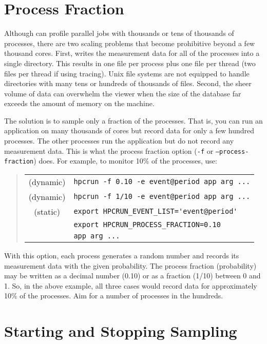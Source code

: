 \section{Process Fraction}

Although \hpcrun{} can profile parallel jobs with thousands or tens of
thousands of processes, there are two scaling problems that become
prohibitive beyond a few thousand cores.  First, \hpcrun{} writes the
measurement data for all of the processes into a single directory.
This results in one file per process plus one file per thread (two
files per thread if using tracing).  Unix file systems are not
equipped to handle directories with many tens or hundreds of thousands
of files.  Second, the sheer volume of data can overwhelm the viewer
when the size of the database far exceeds the amount of memory on the
machine.

The solution is to sample only a fraction of the processes.  That is,
you can run an application on many thousands of cores but record data
for only a few hundred processes.  The other processes run the
application but do not record any measurement data.  This is what the
process fraction option ({\tt -f} or {\tt --process-fraction}) does.
For example, to monitor 10\% of the processes, use:

\begin{quote}
\begin{tabular}{@{}cl}
(dynamic) & \verb|hpcrun -f 0.10 -e event@period app arg ...| \\
(dynamic) & \verb|hpcrun -f 1/10 -e event@period app arg ...| \\
(static)  & \verb|export HPCRUN_EVENT_LIST='event@period'| \\
& \verb|export HPCRUN_PROCESS_FRACTION=0.10| \\
& \verb|app arg ...|
\end{tabular}
\end{quote}

With this option, each process generates a random number and records
its measurement data with the given probability.  The process fraction
(probability) may be written as a decimal number (0.10) or as a
fraction (1/10) between 0 and 1.  So, in the above example, all three
cases would record data for approximately 10\% of the processes.  Aim
for a number of processes in the hundreds.


\section{Starting and Stopping Sampling}

